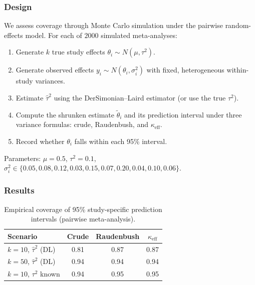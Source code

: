 \documentclass[12pt]{article}
\begin{document}
\subsubsection{Design}

We assess coverage through Monte Carlo simulation under the pairwise
random-effects model.  For each of $2000$ simulated meta-analyses:
\begin{enumerate}
  \item Generate $k$ true study effects
    $\theta_i \sim N(\mu, \tau^2)$.
  \item Generate observed effects
    $y_i \sim N(\theta_i, \sigma_i^2)$ with fixed, heterogeneous
    within-study variances.
  \item Estimate $\hat\tau^2$ using the DerSimonian--Laird estimator
    (or use the true $\tau^2$).
  \item Compute the shrunken estimate $\tilde\theta_i$ and its
    prediction interval under three variance formulas: crude,
    Raudenbush, and $\kappa_{\mathrm{eff}}$.
  \item Record whether $\theta_i$ falls within each 95\% interval.
\end{enumerate}

Parameters: $\mu = 0.5$, $\tau^2 = 0.1$,
$\sigma_i^2 \in \{0.05, 0.08, 0.12, 0.03, 0.15, 0.07, 0.20, 0.04,
0.10, 0.06\}$.

\subsubsection{Results}

\begin{table}[h]
\centering
\caption{Empirical coverage of 95\% study-specific prediction intervals
(pairwise meta-analysis).}
\label{tab:coverage_pw}
\begin{tabular}{lccc}
\toprule
Scenario & Crude & Raudenbush & $\kappa_{\mathrm{eff}}$ \\
\midrule
$k=10$, $\hat\tau^2$ (DL)  & 0.81 & 0.87 & 0.87 \\
$k=50$, $\hat\tau^2$ (DL)  & 0.94 & 0.94 & 0.94 \\
$k=10$, $\tau^2$ known      & 0.94 & 0.95 & 0.95 \\
\bottomrule
\end{tabular}
\end{table}
\end{document}

